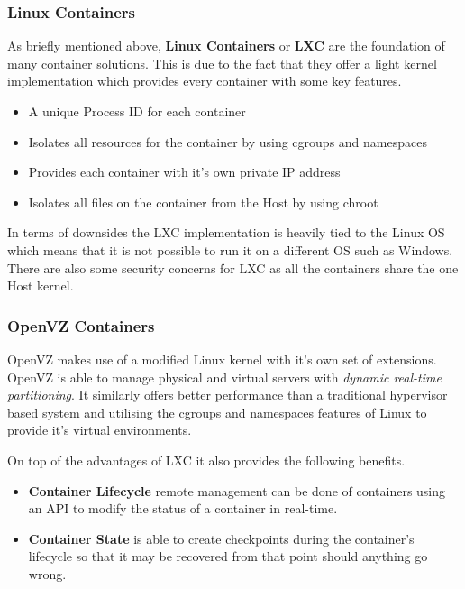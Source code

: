 \subsubsection{Linux Containers}

As briefly mentioned above, \textbf{Linux Containers} or \textbf{LXC} are the foundation of many container solutions. This is due to the fact that they offer a light kernel implementation which provides every container with some key features.

\begin{itemize}
    \item A unique Process ID for each container
    \item Isolates all resources for the container by using cgroups and namespaces
    \item Provides each container with it's own private IP address
    \item Isolates all files on the container from the Host by using chroot
\end{itemize}

In terms of downsides the LXC implementation is heavily tied to the Linux OS which means that it is not possible to run it on a different OS such as Windows. There are also some security concerns for LXC as all the containers share the one Host kernel.

\subsubsection{OpenVZ Containers}

OpenVZ makes use of a modified Linux kernel with it's own set of extensions. OpenVZ is able to manage physical and virtual servers with \textit{dynamic real-time partitioning}. It similarly offers better performance than a traditional hypervisor based system and utilising the cgroups and namespaces features of Linux to provide it's virtual environments.

On top of the advantages of LXC it also provides the following benefits.

\begin{itemize}
    \item \textbf{Container Lifecycle} remote management can be done of containers using an API to modify the status of a container in real-time. 
    \item \textbf{Container State} is able to create checkpoints during the container's lifecycle so that it may be recovered from that point should anything go wrong.
\end{itemize}

